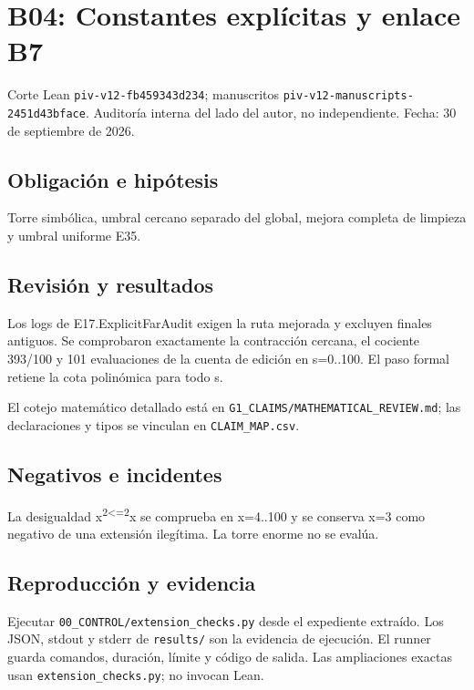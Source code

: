\section{B04: Constantes explícitas y enlace
B7}\label{b04-constantes-expluxedcitas-y-enlace-b7}

Corte Lean \texttt{piv-v12-fb459343d234}; manuscritos
\texttt{piv-v12-manuscripts-2451d43bface}. Auditoría interna del lado
del autor, no independiente. Fecha: 30 de septiembre de 2026.

\subsection{Obligación e hipótesis}\label{obligaciuxf3n-e-hipuxf3tesis}

Torre simbólica, umbral cercano separado del global, mejora completa de
limpieza y umbral uniforme E35.

\subsection{Revisión y resultados}\label{revisiuxf3n-y-resultados}

Los logs de E17.ExplicitFarAudit exigen la ruta mejorada y excluyen
finales antiguos. Se comprobaron exactamente la contracción cercana, el
cociente 393/100 y 101 evaluaciones de la cuenta de edición en s=0..100.
El paso formal retiene la cota polinómica para todo s.

El cotejo matemático detallado está en
\texttt{G1\_CLAIMS/MATHEMATICAL\_REVIEW.md}; las declaraciones y tipos
se vinculan en \texttt{CLAIM\_MAP.csv}.

\subsection{Negativos e incidentes}\label{negativos-e-incidentes}

La desigualdad x\textsuperscript{2\textless=2}x se comprueba en x=4..100
y se conserva x=3 como negativo de una extensión ilegítima. La torre
enorme no se evalúa.

\subsection{Reproducción y evidencia}\label{reproducciuxf3n-y-evidencia}

Ejecutar \texttt{00\_CONTROL/extension\_checks.py} desde el expediente
extraído. Los JSON, stdout y stderr de \texttt{results/} son la
evidencia de ejecución. El runner guarda comandos, duración, límite y
código de salida. Las ampliaciones exactas usan
\texttt{extension\_checks.py}; no invocan Lean.

